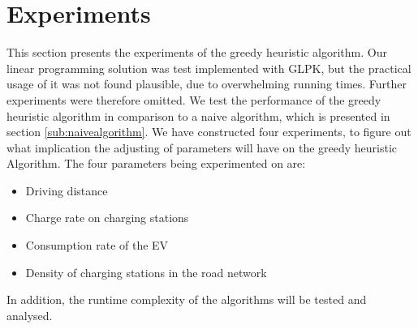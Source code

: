\section{Experiments}
\label{sec:experiments}
This section presents the experiments of the greedy heuristic algorithm. Our linear programming solution was test implemented with GLPK, but the practical usage of it was not found plausible, due to overwhelming running times. Further experiments were therefore omitted. We test the performance of the greedy heuristic algorithm in comparison to a naive algorithm, which is presented in section \ref{sub:naivealgorithm}. We have constructed four experiments, to figure out what implication the adjusting of parameters will have on the greedy heuristic Algorithm. The four parameters being experimented on are:

\begin{itemize}
     \item Driving distance
     \item Charge rate on charging stations
     \item Consumption rate of the EV
     \item Density of charging stations in the road network
 \end{itemize} 

In addition, the runtime complexity of the algorithms will be tested and analysed.  



















